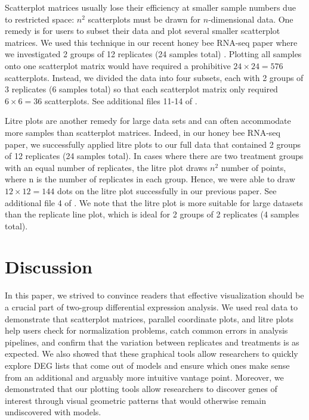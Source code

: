 \documentclass{bmcart}
\begin{document}
\begin{linenumbers}
\begin{doublespacing}
Scatterplot matrices usually lose their efficiency at smaller sample numbers due to restricted space: $n^2$ scatterplots must be drawn for $n$-dimensional data. One remedy is for users to subset their data and plot several smaller scatterplot matrices. We used this technique in our recent honey bee RNA-seq paper where we investigated 2 groups of 12 replicates (24 samples total) \cite{rutter2019transcriptomic}. Plotting all samples onto one scatterplot matrix would have required a prohibitive $24\times24 = 576$ scatterplots. Instead, we divided the data into four subsets, each with 2 groups of 3 replicates (6 samples total) so that each scatterplot matrix only required $6\times6 = 36$ scatterplots. See additional files 11-14 of \cite{rutter2019transcriptomic}. 

Litre plots are another remedy for large data sets and can often accommodate more samples than scatterplot matrices. Indeed, in our honey bee RNA-seq paper, we successfully applied litre plots to our full data that contained 2 groups of 12 replicates (24 samples total). In cases where there are two treatment groups with an equal number of replicates, the litre plot draws $n^2$ number of points, where n is the number of replicates in each group. Hence, we were able to draw $12\times12 = 144$ dots on the litre plot successfully in our previous paper. See additional file 4 of \cite{rutter2019transcriptomic}. We note that the litre plot is more suitable for large datasets than the replicate line plot, which is ideal for 2 groups of 2 replicates (4 samples total).

\section*{Discussion}

In this paper, we strived to convince readers that effective visualization should be a crucial part of two-group differential expression analysis. We used real data to demonstrate that scatterplot matrices, parallel coordinate plots, and litre plots help users check for normalization problems, catch common errors in analysis pipelines, and confirm that the variation between replicates and treatments is as expected. We also showed that these graphical tools allow researchers to quickly explore DEG lists that come out of models and ensure which ones make sense from an additional and arguably more intuitive vantage point. Moreover, we demonstrated that our plotting tools allow researchers to discover genes of interest through visual geometric patterns that would otherwise remain undiscovered with models.


\end{doublespacing}
\end{linenumbers}
\end{document}

